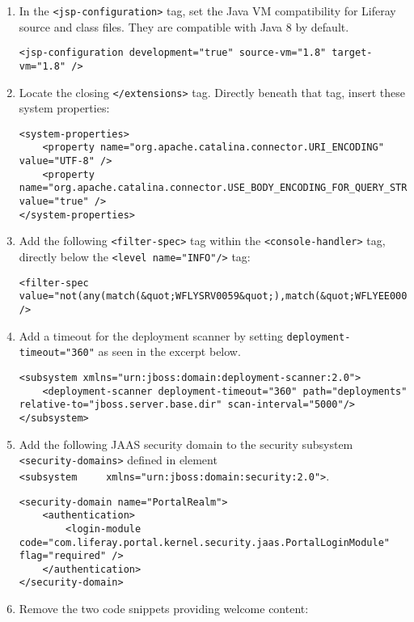 \begin{enumerate}
\def\labelenumi{\arabic{enumi}.}
\item
  In the \texttt{\textless{}jsp-configuration\textgreater{}} tag, set
  the Java VM compatibility for Liferay source and class files. They are
  compatible with Java 8 by default.

\begin{verbatim}
<jsp-configuration development="true" source-vm="1.8" target-vm="1.8" />
\end{verbatim}
\item
  Locate the closing \texttt{\textless{}/extensions\textgreater{}} tag.
  Directly beneath that tag, insert these system properties:

\begin{verbatim}
<system-properties>
    <property name="org.apache.catalina.connector.URI_ENCODING" value="UTF-8" />
    <property name="org.apache.catalina.connector.USE_BODY_ENCODING_FOR_QUERY_STRING" value="true" />
</system-properties>
\end{verbatim}
\item
  Add the following \texttt{\textless{}filter-spec\textgreater{}} tag
  within the \texttt{\textless{}console-handler\textgreater{}} tag,
  directly below the
  \texttt{\textless{}level\ name="INFO"/\textgreater{}} tag:

\begin{verbatim}
<filter-spec value="not(any(match(&quot;WFLYSRV0059&quot;),match(&quot;WFLYEE0007&quot;)))" />
\end{verbatim}
\item
  Add a timeout for the deployment scanner by setting
  \texttt{deployment-timeout="360"} as seen in the excerpt below.

\begin{verbatim}
<subsystem xmlns="urn:jboss:domain:deployment-scanner:2.0">
    <deployment-scanner deployment-timeout="360" path="deployments" relative-to="jboss.server.base.dir" scan-interval="5000"/>
</subsystem>
\end{verbatim}
\item
  Add the following JAAS security domain to the security subsystem
  \texttt{\textless{}security-domains\textgreater{}} defined in element
  \texttt{\textless{}subsystem\ \ \ \ \ xmlns="urn:jboss:domain:security:2.0"\textgreater{}}.

\begin{verbatim}
<security-domain name="PortalRealm">
    <authentication>
        <login-module code="com.liferay.portal.kernel.security.jaas.PortalLoginModule" flag="required" />
    </authentication>
</security-domain>
\end{verbatim}
\item
  Remove the two code snippets providing welcome content:


\end{enumerate}
